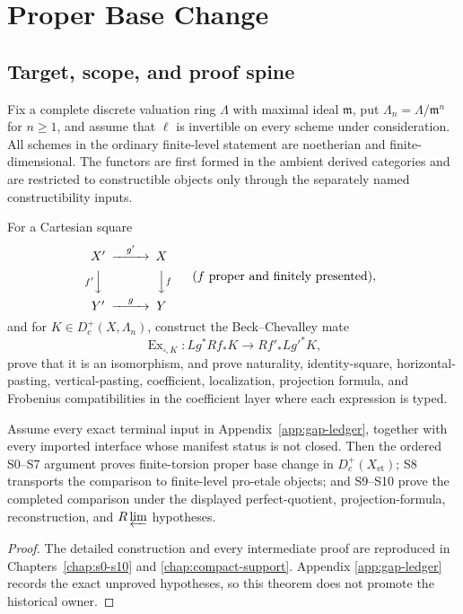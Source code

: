 \chapter{Proper Base Change}\label{chap:proper-base-change}
\section{Target, scope, and proof spine}

Fix a complete discrete valuation ring $\Lambda$ with maximal ideal
$\mathfrak m$, put $\Lambda_n=\Lambda/\mathfrak m^n$ for $n\geq1$, and
assume that $\ell$ is invertible on every scheme under consideration.  All
schemes in the ordinary finite-level statement are noetherian and
finite-dimensional.  The functors are first formed in the ambient derived
categories and are restricted to constructible objects only through the
separately named constructibility inputs.

\begin{openproblem}
\label{OBL-PROPER-BASE-CHANGE}
For a Cartesian square
\[
\begin{CD}
X' @>{g'}>> X\\
@V{f'}VV @VV{f}V\\
Y' @>{g}>> Y
\end{CD}
\qquad (f\text{ proper and finitely presented}),
\]
and for $K\in D_c^+(X,\Lambda_n)$,
construct the Beck--Chevalley mate
\[
 \operatorname{Ex}_{\square,K}:Lg^*Rf_*K\longrightarrow Rf'_*Lg'^*K,
\]
prove that it is an isomorphism, and prove naturality, identity-square,
horizontal-pasting, vertical-pasting, coefficient, localization, projection
formula, and Frobenius compatibilities in the coefficient layer where each
expression is typed.
\end{openproblem}

\begin{conditionaltheorem}
\label{thm:weil-pbc-reassembly-s0-s10}
Assume every exact terminal input in Appendix~\ref{app:gap-ledger}, together
with every imported interface whose manifest status is not closed.  Then the
ordered S0--S7 argument proves finite-torsion proper base change in
$D^+_c(X_{\mathrm{et}})$; S8 transports the comparison to finite-level
pro-etale objects; and S9--S10 prove the completed comparison under the
displayed perfect-quotient, projection-formula, reconstruction, and
$R\varprojlim$ hypotheses.
\end{conditionaltheorem}
\begin{proof}
The detailed construction and every intermediate proof are reproduced in
Chapters~\ref{chap:s0-s10} and \ref{chap:compact-support}.  Appendix
\ref{app:gap-ledger} records the exact unproved hypotheses, so this theorem
does not promote the historical owner.
\end{proof}

